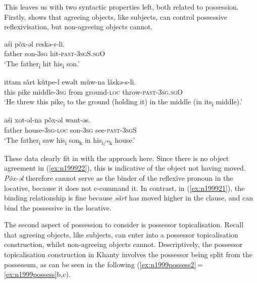 \documentclass[output=paper
,modfonts
,nonflat]{langsci/langscibook}
\begin{document}
This leaves us with two syntactic properties left, both related to possession.
Firstly, \citet{nikolaeva1999} shows that agreeing objects, like subjects, can control possessive reflexivisation, but non-agreeing objects cannot.

\begin{exe}
\ex \citet[][344]{nikolaeva1999} \label{ex:n1999possessrep}
\begin{xlist}
\ex
{\gll a\'{s}i p\v{o}x-əl reskə-s-li.\\
father son-\textsc{3sg} hit-\textsc{past-3sgS.sgO}\\
\glt `The father\textsubscript{i} hit his\textsubscript{i} son.'}

\ex
{\gll ittam s\v{a}rt k\v{u}tpe-l ewəlt m\v{u}w-na l\v{a}skə-s-li.\\
this pike middle-\textsc{3sg} from ground-\textsc{loc} throw-\textsc{past-3sg.sgO}\\
\glt `He threw this pike\textsubscript{i} to the ground (holding it) in the middle (in its\textsubscript{i} middle).'} \label{ex:n199921}

\ex
{\gll a\'{s}i xot-əl-na p\v{o}x-əl want-əs.\\
father house-\textsc{3sg-loc} son-\textsc{3sg} see-\textsc{past-3sgS}\\
\glt `The father\textsubscript{i} saw his\textsubscript{i} son\textsubscript{k} in his\textsubscript{i/*k} house.'} \label{ex:n199922}

\end{xlist}
\end{exe}

\noindent These data clearly fit in with the approach here.
Since there is no object agreement in (\ref{ex:n199922}), this is indicative of the \theme{} object not having moved.
\textit{P\v{o}x-əl} therefore cannot serve as the binder of the reflexive pronoun in the locative, because it does not c-command it.
In contrast, in (\ref{ex:n199921}), the binding relationship is fine because \textit{s\v{a}rt} has moved higher in the clause, and can bind the possessive in the locative.





The second aspect of possession to consider is possessor topicalisation.
Recall that agreeing objects, like subjects, can enter into a possessor topicalisation construction, whilst non-agreeing objects cannot.
Descriptively, the possessor topicalisation construction in Khanty involves the possessor being split from the possessum, as can be seen in the following (\ref{ex:n1999possess2}\,=\,\ref{ex:n1999possess}b,c).
\end{document}
